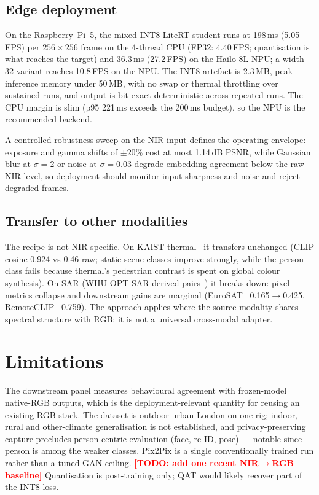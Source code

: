 \documentclass[10pt,twocolumn,letterpaper]{article}
\newcommand{\TODO}[1]{\textcolor{red}{\textbf{[TODO: #1]}}}
\begin{document}
\subsection{Edge deployment}
\label{sec:edge}

On the Raspberry~Pi~5, the mixed-INT8 LiteRT student runs at 198\,ms (5.05\,FPS) per $256\times256$ frame on the 4-thread CPU (FP32: 4.40\,FPS; quantisation is what reaches the target) and 36.3\,ms (27.2\,FPS) on the Hailo-8L NPU; a width-32 variant reaches 10.8\,FPS on the NPU. The INT8 artefact is 2.3\,MB, peak inference memory under 50\,MB, with no swap or thermal throttling over sustained runs, and output is bit-exact deterministic across repeated runs. The CPU margin is slim (p95 221\,ms exceeds the 200\,ms budget), so the NPU is the recommended backend.

A controlled robustness sweep on the NIR input defines the operating envelope: exposure and gamma shifts of $\pm20\%$ cost at most 1.14\,dB PSNR, while Gaussian blur at $\sigma{=}2$ or noise at $\sigma{=}0.03$ degrade embedding agreement below the raw-NIR level, so deployment should monitor input sharpness and noise and reject degraded frames.

\subsection{Transfer to other modalities}

The recipe is not NIR-specific. On KAIST thermal~\cite{hwang2015multispectral} it transfers unchanged (CLIP cosine 0.924 vs 0.46 raw; static scene classes improve strongly, while the person class fails because thermal's pedestrian contrast is spent on global colour synthesis). On SAR (WHU-OPT-SAR-derived pairs~\cite{li2022whuoptsar}) it breaks down: pixel metrics collapse and downstream gains are marginal (EuroSAT~\cite{helber2019eurosat} 0.165$\rightarrow$0.425, RemoteCLIP~\cite{liu2024remoteclip} 0.759). The approach applies where the source modality shares spectral structure with RGB; it is not a universal cross-modal adapter.

\section{Limitations}
\label{sec:limitations}

The downstream panel measures behavioural agreement with frozen-model native-RGB outputs, which is the deployment-relevant quantity for reusing an existing RGB stack. The dataset is outdoor urban London on one rig; indoor, rural and other-climate generalisation is not established, and privacy-preserving capture precludes person-centric evaluation (face, re-ID, pose) --- notable since person is among the weaker classes. Pix2Pix is a single conventionally trained run rather than a tuned GAN ceiling. \TODO{add one recent NIR$\rightarrow$RGB baseline} Quantisation is post-training only; QAT would likely recover part of the INT8 loss.
\end{document}

